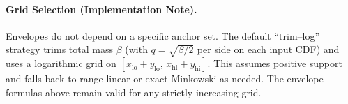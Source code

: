 \documentclass[11pt]{article}
\begin{document}
\paragraph{Grid Selection (Implementation Note).}
Envelopes do not depend on a specific anchor set. The default ``trim--log'' strategy trims total mass
$\beta$ (with $q=\sqrt{\beta/2}$ per side on each input CDF) and uses a logarithmic grid on
$[x_{\mathrm{lo}}+y_{\mathrm{lo}},\,x_{\mathrm{hi}}+y_{\mathrm{hi}}]$. This assumes positive support
and falls back to range-linear or exact Minkowski as needed. The envelope formulas above remain valid
for any strictly increasing grid.
\end{document}

